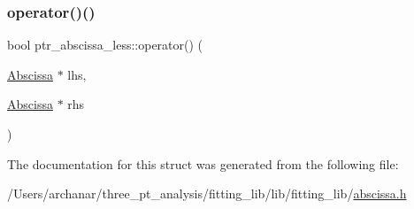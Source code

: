 \mbox{\label{structptr__abscissa__less_a4c0f093567295405c4457fd24eeaadaa}} 
\subsubsection{\texorpdfstring{operator()()}{operator()()}\hspace{0.1cm}{\footnotesize\ttfamily [2/2]}}
{\footnotesize\ttfamily bool ptr\+\_\+abscissa\+\_\+less\+::operator() (\begin{DoxyParamCaption}\item[{\mbox{\hyperlink{classAbscissa}{Abscissa}} $\ast$}]{lhs,  }\item[{\mbox{\hyperlink{classAbscissa}{Abscissa}} $\ast$}]{rhs }\end{DoxyParamCaption})\hspace{0.3cm}{\ttfamily [inline]}}



The documentation for this struct was generated from the following file\+:\begin{DoxyCompactItemize}
\item 
/\+Users/archanar/three\+\_\+pt\+\_\+analysis/fitting\+\_\+lib/lib/fitting\+\_\+lib/\mbox{\hyperlink{lib_2fitting__lib_2abscissa_8h}{abscissa.\+h}}\end{DoxyCompactItemize}
